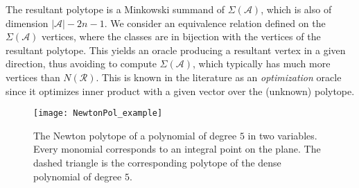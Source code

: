 \documentclass{article}
\def\A{{\mathcal A}} \def\R{{\mathcal R}}
\begin{document}
The resultant polytope is a Minkowski summand of $\Sigma(\A)$,
which is also of dimension $|\A| -2n-1$.
We consider an equivalence relation defined on the $\Sigma(\A)$
vertices, where the classes are in bijection with the vertices of 
the resultant polytope.
This yields an oracle
producing a resultant vertex in a given direction, thus avoiding to compute
$\Sigma(\A)$, which typically has much more vertices than $N(\R)$.
This is known in the literature as an {\em optimization} oracle since
it optimizes inner product with a given vector over the (unknown) polytope.

\begin{figure*}[t] \centering
 \texttt{[image: NewtonPol\_example]}
 \caption{The Newton polytope of a polynomial of degree $5$ in two variables.
Every monomial corresponds to an integral point on the plane. 
The dashed triangle is the corresponding polytope of the dense polynomial of
degree $5$. 
\label{fig:NewPol}} 
\end{figure*}
\end{document}
